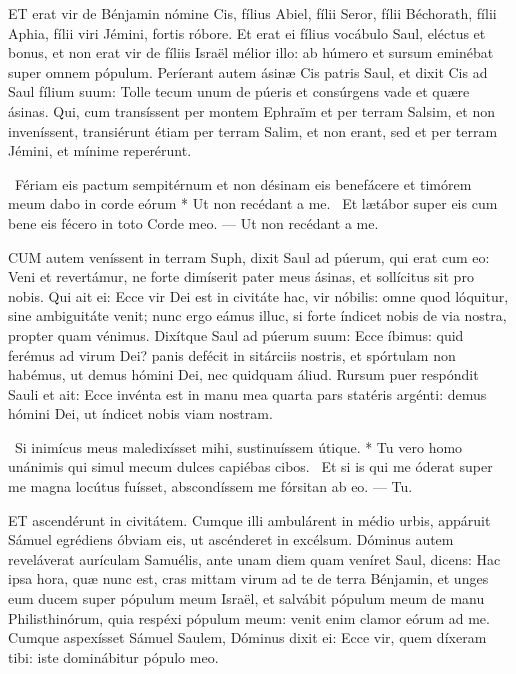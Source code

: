



\lettrine[lines=2]{E}{T} erat vir de Bénjamin nómine Cis, fílius Abiel, fílii Seror, fílii Béchorath, fílii Aphia, fílii viri Jémini, fortis róbore. Et erat ei fílius vocábulo Saul, eléctus et bonus, et non erat vir de fíliis Israël mélior illo: ab húmero et sursum eminébat super omnem pópulum. Períerant autem ásinæ Cis patris Saul, et dixit Cis ad Saul fílium suum: Tolle tecum unum de púeris et consúrgens vade et quære ásinas. Qui, cum transíssent per montem Ephraïm et per terram Salsim, et non inveníssent, transiérunt étiam per terram Salim, et non erant, sed et per terram Jémini, et mínime reperérunt.

\R\ Fériam eis pactum sempitérnum et non désinam eis benefácere et timórem meum dabo in corde eórum * Ut non recédant a me. \V\ Et lætábor super eis cum bene eis fécero in toto Corde meo. --- Ut non recédant a me.


\lettrine[lines=2]{C}{UM} autem veníssent in terram Suph, dixit Saul ad púerum, qui erat cum eo: Veni et revertámur, ne forte dimíserit pater meus ásinas, et sollícitus sit pro nobis. Qui ait ei: Ecce vir Dei est in civitáte hac, vir nóbilis: omne quod lóquitur, sine ambiguitáte venit; nunc ergo eámus illuc, si forte índicet nobis de via nostra, propter quam vénimus. Dixítque Saul ad púerum suum: Ecce íbimus: quid ferémus ad virum Dei? panis defécit in sitárciis nostris, et spórtulam non habémus, ut demus hómini Dei, nec quidquam áliud. Rursum puer respóndit Sauli et ait: Ecce invénta est in manu mea quarta pars statéris argénti: demus hómini Dei, ut índicet nobis viam nostram.

\R\ Si inimícus meus maledixísset mihi, sustinuíssem útique. * Tu vero homo unánimis qui simul mecum dulces capiébas cibos. \V\ Et si is qui me óderat super me magna locútus fuísset, abscondíssem me fórsitan ab eo. --- Tu.


\lettrine[lines=2]{E}{T} ascendérunt in civitátem. Cumque illi ambulárent in médio urbis, appáruit Sámuel egrédiens óbviam eis, ut ascénderet in excélsum. Dóminus autem reveláverat aurículam Samuélis, ante unam diem quam veníret Saul, dicens: Hac ipsa hora, quæ nunc est, cras mittam virum ad te de terra Bénjamin, et unges eum ducem super pópulum meum Israël, et salvábit pópulum meum de manu Philisthinórum, quia respéxi pópulum meum: venit enim clamor eórum ad me. Cumque aspexísset Sámuel Saulem, Dóminus dixit ei: Ecce vir, quem díxeram tibi: iste dominábitur pópulo meo.

